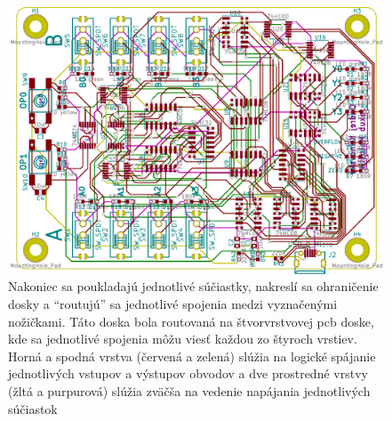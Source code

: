 \documentclass{article}
\begin{document}
    \begin{figure}[h!]
        \centering
        \includegraphics[width=.8\linewidth]{pcb.pdf}
        \caption{Nakoniec sa poukladajú jednotlivé súčiastky, nakreslí sa ohraničenie dosky a ``routujú'' sa jednotlivé spojenia medzi vyznačenými nožičkami. Táto doska bola routovaná na štvorvrstvovej pcb doske, kde sa jednotlivé spojenia môžu viesť každou zo štyroch vrstiev. Horná a spodná vrstva (červená a zelená) slúžia na logické spájanie jednotlivých vstupov a výstupov obvodov a dve prostredné vrstvy (žltá a purpurová) slúžia zväčša na vedenie napájania jednotlivých súčiastok}
    \end{figure}
\end{document}
